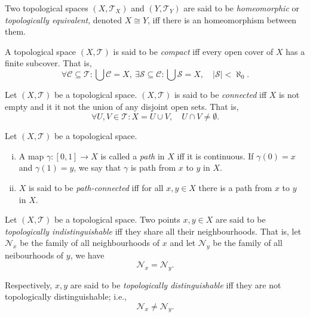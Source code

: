 \begin{definition}
	[homeomorphic]
	\label{def: homomorphisms}
	Two topological spaces $(X, \mathcal T_X)$ and $(Y, \mathcal T_Y)$ are said to be \textit{homeomorphic} or \textit{topologically equivalent}, denoted $X \cong Y$, iff there is an homeomorphism between them.
\end{definition}


\begin{definition}
	[compactness]
	\label{def: compactness}
	A topological space $(X, \mathcal T)$ is said to be \textit{compact} iff every open cover of $X$ has a finite subcover. That is,
	$$
	\forall \mathcal C \subseteq \mathcal T : \bigcup \mathcal C = X, \ \exists \mathcal S \subseteq \mathcal C : \bigcup \mathcal S = X, \quad |\mathcal S| < \aleph_0.
	$$
\end{definition}


\begin{definition}
	[connectedness]
	\label{def: connectedness}
	Let $(X, \mathcal T)$ be a topological space. $(X, \mathcal T)$ is said to be \textit{connected} iff $X$ is not empty and it it not the union of any disjoint open sets. That is,
	$$
	\forall U, V \in \mathcal T : X = U \cup V, \quad U \cap V \ne \emptyset.
	$$
\end{definition}


\begin{definition}
	\label{def: path-connectedness}
	Let $(X, \mathcal T)$ be a topological space.
	\begin{enumerate}[(i)]
		\item A map $\gamma: [0,1] \to X$ is called a \textit{path} in $X$ iff it is continuous. If $\gamma(0) = x$ and $\gamma(1)=y$, we say that $\gamma$ is path from $x$ to $y$ in $X$.
		\item $X$ is said to be \textit{path-connected} iff for all $x, y \in X$ there is a path from $x$ to $y$ in $X$.
	\end{enumerate}
\end{definition}


\begin{definition}
	\label{def: topologically indistinguishable}
	Let $(X, \mathcal T)$ be a topological space. Two points $x,y \in X$ are said to be \textit{topologically indistinguishable} iff they share all their neighbourhoods. That is, let $\mathcal N_x$ be the family of all neighbourhoods of $x$ and let $\mathcal N_y$ be the family of all neibourhoods of $y$, we have
	$$
	\mathcal N_x = \mathcal N_y.
	$$
	
	Respectively, $x,y$ are said to be \textit{topologically distinguishable} iff they are not topologically distinguishable; i.e.,
	$$
	\mathcal N_x \ne \mathcal N_y.
	$$
\end{definition}



